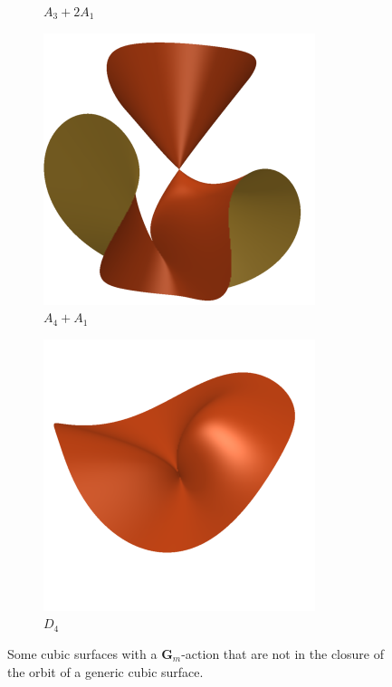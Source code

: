 \documentclass[12pt,reqno]{amsart}
\numberwithin{equation}{section}
\newcommand{\G}{\mathbf G}
\begin{document}
\begin{figure}
\begin{subfigure}{.24\textwidth}
    \caption{$A_3+2A_1$}
  \end{subfigure}
  \begin{subfigure}{.24\textwidth}
    \centering
    \includegraphics[width=\textwidth]{cubicA4_A1}
    \caption{$A_4+A_1$}
  \end{subfigure}
  \begin{subfigure}{.24\textwidth}
    \centering
    \includegraphics[width=\textwidth]{cubicD4}
    \caption{$D_4$}
  \end{subfigure}
  \caption{Some cubic surfaces with a $\G_m$-action that are not in the closure of the orbit of a generic cubic surface.}
  \label{fig:surfaces}
\end{figure}
\end{document}
